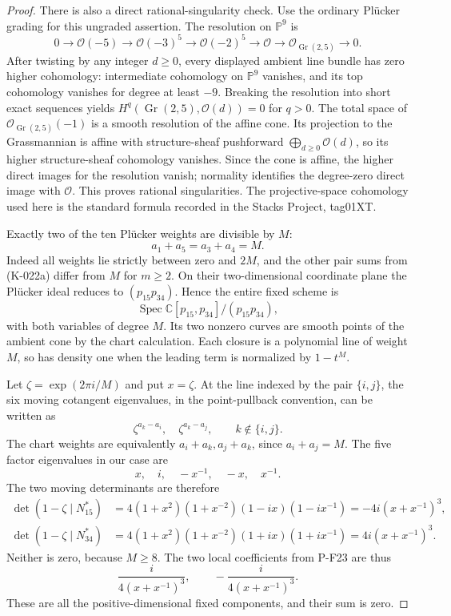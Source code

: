 \begin{proof}
There is also a direct rational-singularity check.  Use the
ordinary Pl\"ucker grading for this ungraded assertion.  The
resolution on $\mathbb P^9$ is
\[
 0\longrightarrow\mathcal O(-5)\longrightarrow
 \mathcal O(-3)^5\longrightarrow\mathcal O(-2)^5
 \longrightarrow\mathcal O\longrightarrow
 \mathcal O_{\operatorname{Gr}(2,5)}\longrightarrow0.
\]
After twisting by any integer $d\ge0$, every displayed ambient
line bundle has zero higher cohomology: intermediate cohomology
on $\mathbb P^9$ vanishes, and its top cohomology vanishes for
degree at least $-9$.  Breaking the resolution into short exact
sequences yields
$H^q(\operatorname{Gr}(2,5),\mathcal O(d))=0$ for $q>0$.
The total space of $\mathcal O_{\operatorname{Gr}(2,5)}(-1)$ is a
smooth resolution of the affine cone.  Its projection to the
Grassmannian is affine with structure-sheaf pushforward
$\bigoplus_{d\ge0}\mathcal O(d)$, so its higher structure-sheaf
cohomology vanishes.  Since the cone is affine, the higher direct
images for the resolution vanish; normality identifies the
degree-zero direct image with $\mathcal O$.  This proves rational
singularities.  The projective-space cohomology used here is the
standard formula recorded in the Stacks Project, tag01XT.

Exactly two of the ten Pl\"ucker weights are divisible by $M$:
\[
                       a_1+a_5=a_3+a_4=M.
\]
Indeed all weights lie strictly between zero and $2M$, and the
other pair sums from (K-022a) differ from $M$ for $m\ge2$.
On their two-dimensional coordinate plane the Pl\"ucker ideal
reduces to $(p_{15}p_{34})$.  Hence the entire fixed scheme is
\[
               \operatorname{Spec}\mathbb C[p_{15},p_{34}]
                              /(p_{15}p_{34}),           \tag{K-022c}
\]
with both variables of degree $M$.  Its two nonzero curves are
smooth points of the ambient cone by the chart calculation.
Each closure is a polynomial line of weight $M$, so has density
one when the leading term is normalized by $1-t^M$.

Let $\zeta=\exp(2\pi i/M)$ and put $x=\zeta$.
At the line indexed by the pair $\{i,j\}$, the six moving
cotangent eigenvalues, in the point-pullback convention, can be
written as
\[
               \zeta^{a_k-a_i},\quad\zeta^{a_k-a_j},
                           \qquad k\notin\{i,j\}.
\]
The chart weights are equivalently $a_i+a_k,a_j+a_k$, since
$a_i+a_j=M$.  The five factor eigenvalues in our case are
\[
                    x,\quad i,\quad -x^{-1},\quad -x,
                           \quad x^{-1}.
\]
The two moving determinants are therefore
\[
\begin{aligned}
 \det(1-\zeta\mid N^*_{15})
   &=4(1+x^2)(1+x^{-2})(1-ix)(1-ix^{-1})
     =-4i(x+x^{-1})^3,\\
 \det(1-\zeta\mid N^*_{34})
   &=4(1+x^2)(1+x^{-2})(1+ix)(1+ix^{-1})
     = 4i(x+x^{-1})^3.
\end{aligned}                                                   \tag{K-022d}
\]
Neither is zero, because $M\ge8$.  The two local coefficients
from P-F23 are thus
\[
             \frac{i}{4(x+x^{-1})^3},\qquad
            -\frac{i}{4(x+x^{-1})^3}.                    \tag{K-022e}
\]
These are all the positive-dimensional fixed components, and
their sum is zero.


\end{proof}
